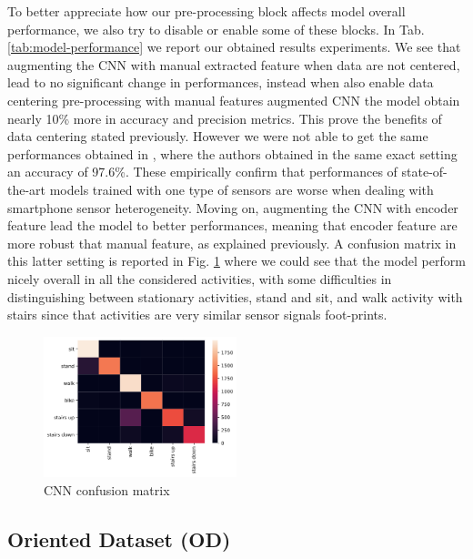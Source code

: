 To better appreciate how our pre-processing block affects model overall performance, we also try to disable or enable some of these blocks. In Tab. \ref{tab:model-performance} we report our obtained results experiments. We see that augmenting the CNN with manual extracted feature when data are not centered, lead to no significant change in performances, instead when also enable data centering pre-processing with manual features augmented CNN the model obtain nearly 10\% more in accuracy and precision metrics. This prove the benefits of data centering stated previously. However we were not able to get the same performances obtained in \cite{ignatov2018real}, where the authors obtained in the same exact setting an accuracy of 97.6\%. These empirically confirm that performances of state-of-the-art models trained with one type of sensors are worse when dealing with smartphone sensor heterogeneity. Moving on, augmenting the CNN with encoder feature lead the model to better performances, meaning that encoder feature are more robust that manual feature, as explained previously. A confusion matrix in this latter setting is reported in Fig. \ref{fig:cnn-confusion-matrix} where we could see that the model perform nicely overall in all the considered activities, with some difficulties in distinguishing between stationary activities, stand and sit, and walk activity with stairs since that activities are very similar sensor signals foot-prints.

\begin{figure}[h]
	\centering
	\includegraphics[width=0.5\textwidth]{images/confusion_matrix.png}
	\caption{CNN confusion matrix}
	\label{fig:cnn-confusion-matrix}
\end{figure}


\subsection{Oriented Dataset (OD)}




